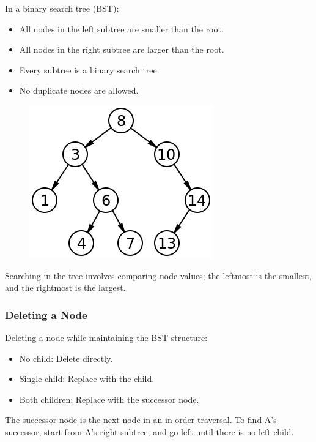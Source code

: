 \documentclass[11pt,journal,compsoc]{IEEEtran}
\begin{document}
In a binary search tree (BST):

\begin{itemize}
    \item All nodes in the left subtree are smaller than the root.
    
    \item All nodes in the right subtree are larger than the root.
    
    \item Every subtree is a binary search tree.
    
    \item No duplicate nodes are allowed.
\end{itemize}

\begin{figure}[H]
    \centering
    \includegraphics[width=0.5\linewidth]{BST.png}
\end{figure}

Searching in the tree involves comparing node values; the leftmost is the smallest, and the rightmost is the largest.


\subsubsection{Deleting a Node}

Deleting a node while maintaining the BST structure:

\begin{itemize}
    \item No child: Delete directly.
    
    \item Single child: Replace with the child.
    
    \item Both children: Replace with the successor node.
\end{itemize}

The successor node is the next node in an in-order traversal. To find A's successor, start from A's right subtree, and go left until there is no left child.
\end{document}

